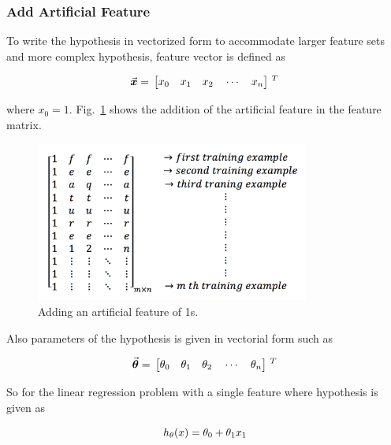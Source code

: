 \subsubsection{Add Artificial Feature}

To write the hypothesis in vectorized form to accommodate larger feature sets and more complex hypothesis, feature vector is defined as

\begin{equation}{\label{eqn:featureVector}}
\vec{\bm{x}}
=\,
\begin{bmatrix}
x_0\quad x_1 \quad  x_2 \quad \cdots \quad x_n 
\end{bmatrix}
\,^T
\end{equation} 

where $x_0 = 1$. Fig.~\ref{fig:addArtificialFeature} shows the addition of the artificial feature in the feature matrix.

\begin{figure}
\begin{center}
\includegraphics[width=9cm]{figures/addArtificialFeature}    %
\caption{Adding an artificial feature of 1s.} 
\label{fig:addArtificialFeature}
\end{center}
\end{figure}

Also parameters of the hypothesis is given in vectorial form such as

\begin{equation}{\label{eqn:parameterVector}}
\vec{\bm{\theta}}
=\,
\begin{bmatrix}
\theta_0\quad \theta_1 \quad  \theta_2 \quad \cdots \quad \theta_n 
\end{bmatrix}
\,^T
\end{equation} 

So for the linear regression problem with a single feature where hypothesis is given as

\begin{equation}{\label{eqn:costFuncOneFeature}}
h_{\theta}(x) = \theta_0 + \theta_1 x_1
\end{equation} 

